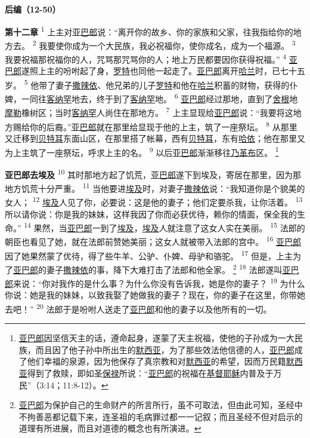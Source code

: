 \begin{center}
	\textbf{\large{\songti 后编（12-50）}}
\end{center}

\textbf{第十二章\quad}
\textsuperscript{1}
上主对\uline{亚巴郎}说：“离开你的故乡、你的家族和父家，往我指给你的地方去。
\textsuperscript{2}
我要使你成为一个大民族，我必祝福你，使你成名，成为一个福源。
\textsuperscript{3}
我要祝福那祝福你的人，咒骂那咒骂你的人；地上万民都要因你获得祝福。”
\textsuperscript{4}
\uline{亚巴郎}遂照上主的吩咐起了身，\uline{罗特}也同他一起走了。\uline{亚巴郎}离开\uline{哈兰}时，已七十五岁。
\textsuperscript{5}
他带了妻子\uline{撒辣依}、他兄弟的儿子\uline{罗特}和他在\uline{哈兰}积蓄的财物，获得的仆婢，一同往\uline{客纳罕}地去，终于到了\uline{客纳罕}地。
\textsuperscript{6}
\uline{亚巴郎}经过那地，直到了\uline{舍根}地\uline{摩勒}橡树区；当时\uline{客纳罕}人尚住在那地方。
\textsuperscript{7}
上主显现给\uline{亚巴郎}说：“我要将这地方赐给你的后裔。”\uline{亚巴郎}就在那里给显现于他的上主，筑了一座祭坛。
\textsuperscript{8}
从那里又迁移到\uline{贝特耳}东面山区，在那里搭了帐幕，西有\uline{贝特耳}，东有\uline{哈依}；他在那里又为上主筑了一座祭坛，呼求上主的名。
\textsuperscript{9}
以后\uline{亚巴郎}渐渐移往\uline{乃革布}区。
\footnote{\uline{亚巴郎}因坚信天主的话，遵命起身，遂蒙了天主祝福，使他的子孙成为一大民族，而且因了他子孙中所出生的\uline{默西亚}，为了那些效法他信德的人，\uline{亚巴郎}成了他们幸福的泉源，因为他保存了真宗教和对\uline{默西亚}的希望，因而万民籍\uline{默西亚}得到了救赎，即如圣\uline{保禄}所说：“\uline{亚巴郎}的祝福在\uline{基督}\uline{耶稣}内普及于万民”（3:14；11:8-12）。}

\textbf{亚巴郎去埃及\quad}
\textsuperscript{10}
其时那地方起了饥荒，\uline{亚巴郎}遂下到埃及，寄居在那里，因为那地方饥荒十分严重。
\textsuperscript{11}
当他要进\uline{埃及}时，对妻子\uline{撒辣依}说：“我知道你是个貌美的女人；
\textsuperscript{12}
\uline{埃及}人见了你，必要说：这是他的妻子；他们定要杀我，让你活着。
\textsuperscript{13}
所以请你说：你是我的妹妹，这样我因了你而必获优待，赖你的情面，保全我的生命。”
\textsuperscript{14}
果然，当\uline{亚巴郎}一到了\uline{埃及}，\uline{埃及}人就注意了这女人实在美丽。
\textsuperscript{15}
法郎的朝臣也看见了她，就在法郎前赞她美丽；这女人就被带入法郎的宫中。
\textsuperscript{16}
\uline{亚巴郎}因了她果然蒙了优待，得了些牛羊、公驴、仆婢、母驴和骆驼。
\textsuperscript{17}
但是，上主为了\uline{亚巴郎}的妻子\uline{撒辣依}的事，降下大难打击了法郎和他全家。
\footnote{\uline{亚巴郎}为保护自己的生命财产的所言所行，虽不可取法，但由此可知，圣经中不拘善恶都记载下来，连圣祖的毛病罪过都一一记叙；而且圣经不但对启示的道理有所进展，而且对道德的概念也有所演进。}
\textsuperscript{18}
法郎遂叫\uline{亚巴郎}来说：“你对我作的是什么事？为什么你没有告诉我，她是你的妻子？
\textsuperscript{19}
为什么你说：她是我的妹妹，以致我娶了她做我的妻子？现在，你的妻子在这里，你带她去吧！”
\textsuperscript{20}
法郎于是吩咐人送走了\uline{亚巴郎}和他的妻子以及他所有的一切。

